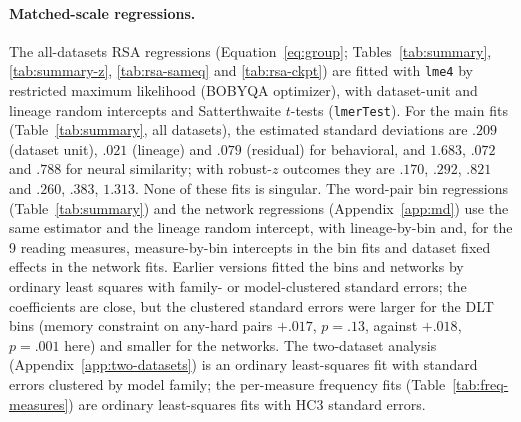 \paragraph{Matched-scale regressions.} The all-datasets RSA regressions (Equation~\ref{eq:group}; Tables~\ref{tab:summary}, \ref{tab:summary-z}, \ref{tab:rsa-sameq} and \ref{tab:rsa-ckpt}) are fitted with \texttt{lme4} by restricted maximum likelihood (BOBYQA optimizer), with dataset-unit and lineage random intercepts and Satterthwaite $t$-tests (\texttt{lmerTest}). For the main fits (Table~\ref{tab:summary}, all datasets), the estimated standard deviations are $.209$ (dataset unit), $.021$ (lineage) and $.079$ (residual) for behavioral, and $1.683$, $.072$ and $.788$ for neural similarity; with robust-$z$ outcomes they are $.170$, $.292$, $.821$ and $.260$, $.383$, $1.313$. None of these fits is singular. The word-pair bin regressions (Table~\ref{tab:summary}) and the network regressions (Appendix~\ref{app:md}) use the same estimator and the lineage random intercept, with lineage-by-bin and, for the 9 reading measures, measure-by-bin intercepts in the bin fits and dataset fixed effects in the network fits. Earlier versions fitted the bins and networks by ordinary least squares with family- or model-clustered standard errors; the coefficients are close, but the clustered standard errors were larger for the DLT bins (memory constraint on any-hard pairs $+.017$, $p=.13$, against $+.018$, $p=.001$ here) and smaller for the networks. The two-dataset analysis (Appendix~\ref{app:two-datasets}) is an ordinary least-squares fit with standard errors clustered by model family; the per-measure frequency fits (Table~\ref{tab:freq-measures}) are ordinary least-squares fits with HC3 standard errors.



